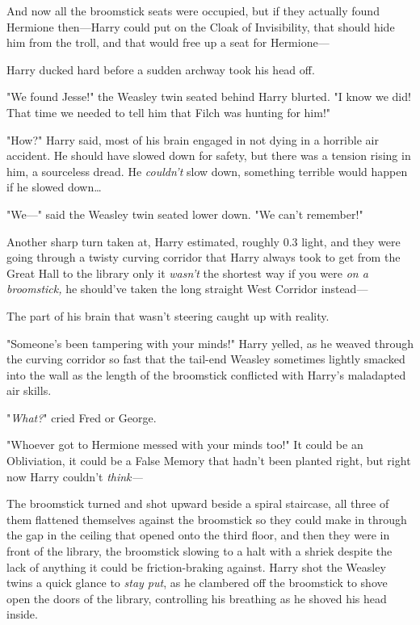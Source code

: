 And now all the broomstick seats were occupied, but if they actually found 
Hermione then---Harry could put on the Cloak of Invisibility, that should hide 
him from the troll, and that would free up a seat for Hermione---

Harry ducked hard before a sudden archway took his head off.

"We found Jesse!" the Weasley twin seated behind Harry blurted. "I know we did! 
That time we needed to tell him that Filch was hunting for him!"

"How?" Harry said, most of his brain engaged in not dying in a horrible air 
accident. He should have slowed down for safety, but there was a tension rising 
in him, a sourceless dread. He \emph{couldn't} slow down, something terrible 
would happen if he slowed down{\ldots}

"We---" said the Weasley twin seated lower down. "We can't remember!"

Another sharp turn taken at, Harry estimated, roughly 0.3%
light, and they were going through a twisty curving corridor that Harry always 
took to get from the Great Hall to the library only it \emph{wasn't} the 
shortest way if you were \emph{on a broomstick,} he should've taken the long 
straight West Corridor instead---

The part of his brain that wasn't steering caught up with reality.

"Someone's been tampering with your minds!" Harry yelled, as he weaved through 
the curving corridor so fast that the tail-end Weasley sometimes lightly 
smacked into the wall as the length of the broomstick conflicted with Harry's 
maladapted air skills.

"\emph{What?}" cried Fred or George.

"Whoever got to Hermione messed with your minds too!" It could be an 
Obliviation, it could be a False Memory that hadn't been planted right, but 
right now Harry couldn't \emph{think---}

The broomstick turned and shot upward beside a spiral staircase, all three of 
them flattened themselves against the broomstick so they could make in through 
the gap in the ceiling that opened onto the third floor, and then they were in 
front of the library, the broomstick slowing to a halt with a shriek despite 
the lack of anything it could be friction-braking against. Harry shot the 
Weasley twins a quick glance to \emph{stay put}, as he clambered off the 
broomstick to shove open the doors of the library, controlling his breathing as 
he shoved his head inside.

